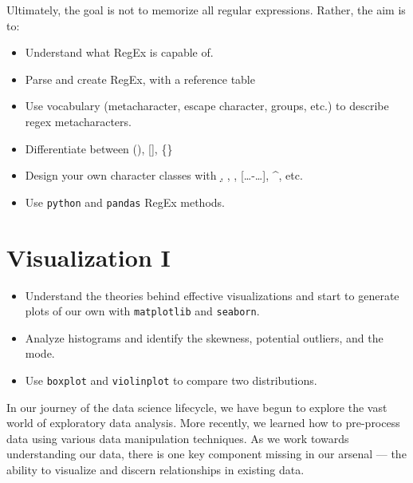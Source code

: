 \documentclass[
  letterpaper,
  DIV=11,
  numbers=noendperiod]{scrreprt}
\providecommand{\tightlist}{%
  \setlength{\itemsep}{0pt}\setlength{\parskip}{0pt}}\usepackage{longtable,booktabs,array}
\begin{document}
Ultimately, the goal is not to memorize all regular expressions. Rather,
the aim is to:

\begin{itemize}
\tightlist
\item
  Understand what RegEx is capable of.
\item
  Parse and create RegEx, with a reference table
\item
  Use vocabulary (metacharacter, escape character, groups, etc.) to
  describe regex metacharacters.
\item
  Differentiate between (), {[}{]}, \{\}
\item
  Design your own character classes with \d, \w, \s,
  {[}\ldots-\ldots{]}, \^{}, etc.
\item
  Use \texttt{python} and \texttt{pandas} RegEx methods.
\end{itemize}


\chapter{Visualization I}\label{visualization-i}

\begin{tcolorbox}[enhanced jigsaw, bottomrule=.15mm, coltitle=black, breakable, titlerule=0mm, colframe=quarto-callout-note-color-frame, leftrule=.75mm, arc=.35mm, colbacktitle=quarto-callout-note-color!10!white, rightrule=.15mm, opacityback=0, toptitle=1mm, bottomtitle=1mm, toprule=.15mm, left=2mm, opacitybacktitle=0.6, title=\textcolor{quarto-callout-note-color}{\faInfo}\hspace{0.5em}{Learning Outcomes}, colback=white]

\begin{itemize}
\tightlist
\item
  Understand the theories behind effective visualizations and start to
  generate plots of our own with \texttt{matplotlib} and
  \texttt{seaborn}.
\item
  Analyze histograms and identify the skewness, potential outliers, and
  the mode.
\item
  Use \texttt{boxplot} and \texttt{violinplot} to compare two
  distributions.
\end{itemize}

\end{tcolorbox}

In our journey of the data science lifecycle, we have begun to explore
the vast world of exploratory data analysis. More recently, we learned
how to pre-process data using various data manipulation techniques. As
we work towards understanding our data, there is one key component
missing in our arsenal --- the ability to visualize and discern
relationships in existing data.
\end{document}
